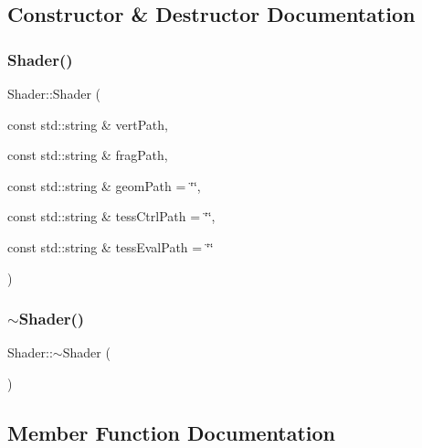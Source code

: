 \subsection{Constructor \& Destructor Documentation}
\mbox{\label{classngl_1_1_shader_a8fe213cc5bf88e3959fd0334c384b9ab}} 
\subsubsection{\texorpdfstring{Shader()}{Shader()}}
{\footnotesize\ttfamily Shader\+::\+Shader (\begin{DoxyParamCaption}\item[{const std\+::string \&}]{vert\+Path,  }\item[{const std\+::string \&}]{frag\+Path,  }\item[{const std\+::string \&}]{geom\+Path = {\ttfamily \char`\"{}\char`\"{}},  }\item[{const std\+::string \&}]{tess\+Ctrl\+Path = {\ttfamily \char`\"{}\char`\"{}},  }\item[{const std\+::string \&}]{tess\+Eval\+Path = {\ttfamily \char`\"{}\char`\"{}} }\end{DoxyParamCaption})}

\mbox{\label{classngl_1_1_shader_aff01df87e8a102f270b5b135a295e59d}} 
\subsubsection{\texorpdfstring{$\sim$\+Shader()}{~Shader()}}
{\footnotesize\ttfamily Shader\+::$\sim$\+Shader (\begin{DoxyParamCaption}{ }\end{DoxyParamCaption})}



\subsection{Member Function Documentation}
\mbox{\label{classngl_1_1_shader_a8b5c8c4788d011a65d158ef8428d1ece}} 
